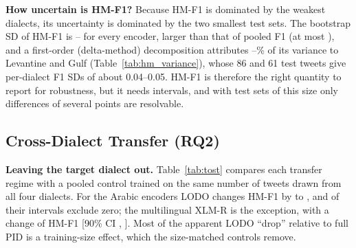 \documentclass[11pt]{article}
\begin{document}
\begin{table}[tbp]
\caption{McNemar tests on seed-ensembled (majority-vote) PID predictions: $b$/$c$ = tweets only A / only B classifies correctly. $^*$Holm-adjusted $p<0.05$ over all 30 tests.}
\label{tab:mcnemar}
\centering
\footnotesize
{}
\end{table}

\begin{table}[tbp]
\caption{Bayesian beta-binomial mixed model of per-tweet correctness under PID: dialect effects (log-odds of a correct prediction relative to MSA, i.e.\ $b_d+g_{m,d}$) per encoder, posterior mean with 95\% credible interval ($^*$: interval excludes zero). The fertility coefficient is per standard deviation within encoder $\times$ dialect.}
\label{tab:glmm}
\centering
\footnotesize
{}
\end{table}

\textbf{How uncertain is HM-F1?} Because HM-F1 is dominated by the weakest dialects, its uncertainty is dominated by the two smallest test sets. The bootstrap SD of HM-F1 is \hmSdMin--\hmSdMax{} for every encoder, larger than that of pooled F1 (at most \pooledSdMax), and a first-order (delta-method) decomposition attributes \levGlfShareMin--\levGlfShareMax\% of its variance to Levantine and Gulf (Table~\ref{tab:hm_variance}), whose 86 and 61 test tweets give per-dialect F1 SDs of about 0.04--0.05. HM-F1 is therefore the right quantity to report for robustness, but it needs intervals, and with test sets of this size only differences of several points are resolvable.

\begin{table}[tbp]
\caption{Uncertainty of HM-F1 under PID: bootstrap SD of pooled F1, HM-F1 and each dialect's F1, and each dialect's first-order share of the bootstrap variance of HM-F1.}
\label{tab:hm_variance}
\centering
\footnotesize
\setlength{\tabcolsep}{3pt}
\end{table}

\subsection{Cross-Dialect Transfer (RQ2)}
\label{sec:res_transfer}
\textbf{Leaving the target dialect out.} Table~\ref{tab:tost} compares each transfer regime with a pooled control trained on the same number of tweets drawn from all four dialects. For the \nArab{} Arabic encoders LODO changes HM-F1 by \lodoArDeltaMin{} to \lodoArDeltaMax{}, and \lodoArSig{} of their intervals exclude zero; the multilingual XLM-R is the exception, with a change of \xlmLodo{} HM-F1 [90\% CI \xlmLodoLo, \xlmLodoHi]. Most of the apparent LODO ``drop'' relative to full PID is a training-size effect, which the size-matched controls remove.
\end{document}
